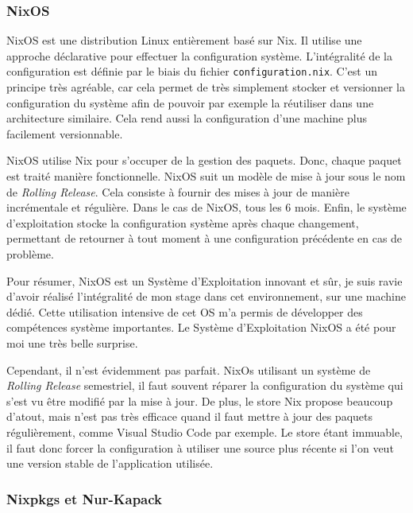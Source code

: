 \documentclass[a4paper,french,12pt, titlepage]{article}
\begin{document}
\hypertarget{nixos}{%
\subsubsection{NixOS}\label{nixos}}

NixOS est une distribution Linux entièrement basé sur Nix. Il utilise
une approche déclarative pour effectuer la configuration système.
L'intégralité de la configuration est définie par le biais du fichier
\texttt{configuration.nix}. C'est un principe très agréable, car cela
permet de très simplement stocker et versionner la configuration du
système afin de pouvoir par exemple la réutiliser dans une architecture
similaire. Cela rend aussi la configuration d'une machine plus
facilement versionnable.\newline

NixOS utilise Nix pour s'occuper de la gestion des paquets. Donc, chaque
paquet est traité manière fonctionnelle. NixOS suit un modèle de mise à
jour sous le nom de \emph{Rolling Release}. Cela consiste à fournir des
mises à jour de manière incrémentale et régulière. Dans le cas de NixOS,
tous les 6 mois. Enfin, le système d'exploitation stocke la
configuration système après chaque changement, permettant de retourner à
tout moment à une configuration précédente en cas de problème.\newline

Pour résumer, NixOS est un Système d'Exploitation innovant et sûr, je
suis ravie d'avoir réalisé l'intégralité de mon stage dans cet
environnement, sur une machine dédié. Cette utilisation intensive de cet
OS m'a permis de développer des compétences système importantes. Le
Système d'Exploitation NixOS a été pour moi une très belle
surprise.\newline

Cependant, il n'est évidemment pas parfait. NixOs utilisant un système
de \emph{Rolling Release} semestriel, il faut souvent réparer la
configuration du système qui s'est vu être modifié par la mise à jour.
De plus, le store Nix propose beaucoup d'atout, mais n'est pas très
efficace quand il faut mettre à jour des paquets régulièrement, comme
Visual Studio Code par exemple. Le store étant immuable, il faut donc
forcer la configuration à utiliser une source plus récente si l'on veut
une version stable de l'application utilisée.\newline

\hypertarget{nixpkgs-et-nur-kapack}{%
\subsubsection{Nixpkgs et Nur-Kapack}\label{nixpkgs-et-nur-kapack}}
\end{document}
